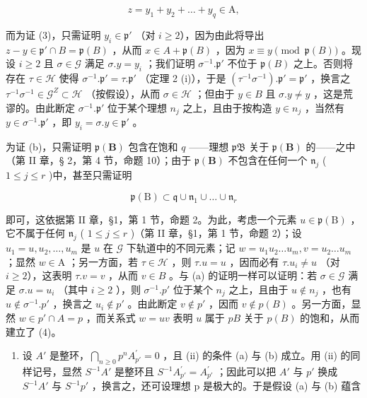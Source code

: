 \[
z = y _ {1} + y _ {2} + \dots + y _ {q} \in \mathrm{A},
\]

而为证 (3)，只需证明 \(y_i \in \mathfrak{p}'\) （对 \(i \geqslant 2\)），因为由此将导出 \(z - y \in \mathfrak{p}' \cap B = \mathfrak{p}(B)\) ，从而 \(x \in A + \mathfrak{p}(B)\) ，因为 \(x \equiv y \pmod{\mathfrak{p}(B)}\) 。现设 \(i \geqslant 2\) 且 \(\sigma \in \mathcal{G}\) 满足 \(\sigma.y = y_i\) ；我们证明 \(\sigma^{-1}. \mathfrak{p}'\) 不位于 \(\mathfrak{p}(B)\) 之上。否则将存在 \(\tau \in \mathcal{H}\) 使得 \(\sigma^{-1}. \mathfrak{p}' = \tau. \mathfrak{p}'\) （定理 2 (i)），于是 \((\tau^{-1}\sigma^{-1}). \mathfrak{p}' = \mathfrak{p}'\) ，换言之 \(\tau^{-1}\sigma^{-1} \in \mathcal{G}^{Z} \subset \mathcal{H}\) （按假设），从而 \(\sigma \in \mathcal{H}\) ；但由于 \(y \in B\) 且 \(\sigma.y \neq y\) ，这是荒谬的。由此断定 \(\sigma^{-1}. \mathfrak{p}'\) 位于某个理想 \(n_j\) 之上，且由于按构造 \(y \in n_j\) ，当然有 \(y \in \sigma^{-1}. \mathfrak{p}'\) ，即 \(y_i = \sigma.y \in \mathfrak{p}'\) 。

为证 (b)，只需证明 \(\mathfrak{p}(\mathbf{B})\) 包含在饱和 \(q\) ——理想 \(\mathfrak{pB}\) 关于 \(\mathfrak{p}(\mathbf{B})\) 的——之中（第 II 章，§ 2，第 4 节，命题 10）；由于 \(\mathfrak{p}(\mathbf{B})\) 不包含在任何一个 \(\mathfrak{n}_j\) ( \(1 \leqslant j \leqslant r\) )中，甚至只需证明

\[
\mathfrak {p} (\mathrm{B}) \subset \mathfrak {q} \cup \mathfrak {n} _ {1} \cup \dots \cup \mathfrak {n} _ {r}\tag{4}
\]

即可，这依据第 II 章，§1，第 1 节，命题 2。为此，考虑一个元素 \(u \in \mathfrak{p}(\mathrm{B})\) ，它不属于任何 \(\mathfrak{n}_j\) ( \(1 \leqslant j \leqslant r\) )（第 II 章，§1，第 1 节，命题 2）；设 \(u_1 = u, u_2, \ldots, u_m\) 是 \(u\) 在 \(\mathcal{G}\) 下轨道中的不同元素；记 \(w = u_1u_2\ldots u_m, v = u_2\ldots u_m\) ；显然 \(w \in \mathrm{A}\) ；另一方面，若 \(\tau \in \mathcal{H}\) ，则 \(\tau .u = u\) ，因而必有 \(\tau .u_{i} \neq u\) （对 \(i \geqslant 2\)），这表明 \(\tau .v = v\) ，从而 \(v \in B\) 。与 (a) 的证明一样可以证明：若 \(\sigma \in \mathcal{G}\) 满足 \(\sigma .u = u_{i}\) （其中 \(i \geqslant 2\) ），则 \(\sigma^{-1}.p'\) 位于某个 \(n_{j}\) 之上，且由于 \(u \notin n_{j}\) ，也有 \(u \notin \sigma^{-1}.p'\) ，换言之 \(u_{i} \notin p'\) 。由此断定 \(v \notin p'\) ，因而 \(v \notin p(B)\) 。另一方面，显然 \(w \in p' \cap A = p\) ，而关系式 \(w = uv\) 表明 \(u\) 属于 \(pB\) 关于 \(p(B)\) 的饱和，从而建立了 (4)。

\begin{enumerate}
\def\labelenumi{(\roman{enumi})}
\setcounter{enumi}{2}
\tightlist
\item
  设 \(A'\) 是整环，\(\bigcap_{n\geq0}p^{n}A_{p'}^{\prime}=0\) ，且 (ii) 的条件 (a) 与 (b) 成立。用 (ii) 的同样记号，显然 \(S^{-1}A'\) 是整环且 \(S^{-1}A_{p'}^{\prime}=A_{p'}^{\prime}\) ；因此可以把 \(A'\) 与 \(p'\) 换成 \(S^{-1}A'\) 与 \(S^{-1}p'\) ，换言之，还可设理想 p 是极大的。于是假设 (a) 与 (b) 蕴含
\end{enumerate}

